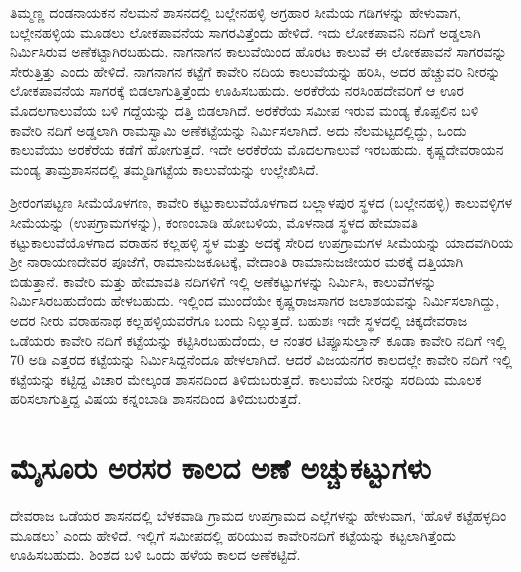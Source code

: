 ತಿಮ್ಮಣ್ಣ ದಂಡನಾಯಕನ ನೆಲಮನೆ ಶಾಸನದಲ್ಲಿ ಬಲ್ಲೇನಹಳ್ಳಿ ಅಗ್ರಹಾರ ಸೀಮೆಯ ಗಡಿಗಳನ್ನು ಹೇಳುವಾಗ, ಬಲ್ಲೇನಹಳ್ಳಿಯ ಮೂಡಲು ಲೋಕಪಾವನೆಯ ಸಾಗರವಿತ್ತೆಂದು ಹೇಳಿದೆ. ಇದು ಲೋಕಪಾವನಿ ನದಿಗೆ ಅಡ್ಡಲಾಗಿ ನಿರ್ಮಿಸಿರುವ ಅಣೆಕಟ್ಟಾಗಿರಬಹುದು. ನಾಗನಾಗನ ಕಾಲುವೆಯಿಂದ ಹೊರಟ ಕಾಲುವೆ ಈ ಲೋಕಪಾವನೆ ಸಾಗರವನ್ನು ಸೇರುತ್ತಿತ್ತು ಎಂದು ಹೇಳಿದೆ. ನಾಗನಾಗನ ಕಟ್ಟೆಗೆ ಕಾವೇರಿ ನದಿಯ ಕಾಲುವೆಯನ್ನು ಹರಿಸಿ, ಅದರ ಹೆಚ್ಚುವರಿ ನೀರನ್ನು ಲೋಕಪಾವನೆಯ ಸಾಗರಕ್ಕೆ ಬಿಡಲಾಗುತ್ತಿತ್ತೆಂದು ಊಹಿಸಬಹುದು. ಅರಕೆರೆಯ ನರಸಿಂಹದೇವರಿಗೆ ಆ ಊರ ಮೊದಲಗಾಲುವೆಯ ಬಳಿ ಗದ್ದೆಯನ್ನು ದತ್ತಿ ಬಿಡಲಾಗಿದೆ.  ಅರಕೆರೆಯ ಸಮೀಪ ಇರುವ ಮಂಡ್ಯ ಕೊಪ್ಪಲಿನ ಬಳಿ ಕಾವೇರಿ ನದಿಗೆ ಅಡ್ಡಲಾಗಿ ರಾಮಸ್ವಾಮಿ ಅಣೆಕಟ್ಟೆಯನ್ನು ನಿರ್ಮಿಸಲಾಗಿದೆ. ಅದು ನೆಲಮಟ್ಟದಲ್ಲಿದ್ದು, ಒಂದು ಕಾಲುವೆಯು ಅರಕೆರೆಯ ಕಡೆಗೆ ಹೋಗುತ್ತದೆ. ಇದೇ ಅರಕೆರೆಯ ಮೊದಲಗಾಲುವೆ ಇರಬಹುದು. ಕೃಷ್ಣದೇವರಾಯನ ಮಂಡ್ಯ ತಾಮ್ರಶಾಸನದಲ್ಲಿ ತಮ್ಮಡಿಗಟ್ಟೆಯ ಕಾಲುವೆಯನ್ನು ಉಲ್ಲೇಖಿಸಿದೆ.

ಶ‍್ರೀರಂಗಪಟ್ಟಣ ಸೀಮೆಯೊಳಗಣ, ಕಾವೇರಿ ಕಟ್ಟುಕಾಲುವೆಯೊಳಗಾದ ಬಲ್ಲಾಳಪುರ ಸ್ಥಳದ (ಬಲ್ಲೇನಹಳ್ಳಿ) ಕಾಲುವಳ್ಳಿಗಳ ಸೀಮೆಯನ್ನು (ಉಪಗ್ರಾಮಗಳನ್ನು), ಕಂಣಂಬಾಡಿ ಹೋಬಳಿಯ, ಮೊಳನಾಡ ಸ್ಥಳದ ಹೇಮಾವತಿ ಕಟ್ಟುಕಾಲುವೆ\-ಯೊಳಗಾದ ವರಾಹನ ಕಲ್ಲಹಳ್ಳಿ ಸ್ಥಳ ಮತ್ತು ಅದಕ್ಕೆ ಸೇರಿದ ಉಪಗ್ರಾಮಗಳ ಸೀಮೆಯನ್ನು ಯಾದವಗಿರಿಯ ಶ‍್ರೀ ನಾರಾಯಣದೇವರ ಪೂಜೆಗೆ, ರಾಮಾನುಜಕೂಟಕ್ಕೆ, ವೇದಾಂತಿ ರಾಮಾನುಜಜೀಯರ ಮಠಕ್ಕೆ ದತ್ತಿಯಾಗಿ ಬಿಡುತ್ತಾನೆ. ಕಾವೇರಿ ಮತ್ತು ಹೇಮಾವತಿ ನದಿಗಳಿಗೆ ಇಲ್ಲಿ ಅಣೆಕಟ್ಟುಗಳನ್ನು ನಿರ್ಮಿಸಿ, ಕಾಲುವೆಗಳನ್ನು ನಿರ್ಮಿಸಿರಬಹುದೆಂದು ಹೇಳಬಹುದು. ಇಲ್ಲಿಂದ ಮುಂದೆಯೇ ಕೃಷ್ಣರಾಜಸಾಗರ ಜಲಾಶಯವನ್ನು ನಿರ್ಮಿಸಲಾಗಿದ್ದು, ಅದರ ನೀರು ವರಾಹನಾಥ ಕಲ್ಲಹಳ್ಳಿಯವರೆಗೂ ಬಂದು ನಿಲ್ಲುತ್ತದೆ. ಬಹುಶಃ ಇದೇ ಸ್ಥಳದಲ್ಲಿ ಚಿಕ್ಕದೇವರಾಜ ಒಡೆಯರು ಕಾವೇರಿ ನದಿಗೆ ಕಟ್ಟೆಯನ್ನು ಕಟ್ಟಿಸಿರಬಹುದೆಂದು, ಆ ನಂತರ ಟಿಪ್ಪೂಸುಲ್ತಾನ್​ ಕೂಡಾ ಕಾವೇರಿ ನದಿಗೆ ಇಲ್ಲಿ 70 ಅಡಿ ಎತ್ತರದ ಕಟ್ಟೆಯನ್ನು ನಿರ್ಮಿಸಿದ್ದನೆಂದೂ ಹೇಳಲಾಗಿದೆ. ಆದರೆ ವಿಜಯನಗರ ಕಾಲದಲ್ಲೇ ಕಾವೇರಿ ನದಿಗೆ ಇಲ್ಲಿ ಕಟ್ಟೆಯನ್ನು ಕಟ್ಟಿದ್ದ ವಿಚಾರ ಮೇಲ್ಕಂಡ ಶಾಸನದಿಂದ ತಿಳಿದುಬರುತ್ತದೆ. ಕಾಲುವೆಯ ನೀರನ್ನು ಸರದಿಯ ಮೂಲಕ ಹರಿಸಲಾಗುತ್ತಿದ್ದ ವಿಷಯ ಕನ್ನಂಬಾಡಿ ಶಾಸನದಿಂದ ತಿಳಿದುಬರುತ್ತದೆ.

\section*{ಮೈಸೂರು ಅರಸರ ಕಾಲದ ಅಣೆ ಅಚ್ಚುಕಟ್ಟುಗಳು}

ದೇವರಾಜ ಒಡೆಯರ ಶಾಸನದಲ್ಲಿ ಬೆಳಕವಾಡಿ ಗ್ರಾಮದ ಉಪಗ್ರಾಮದ ಎಲ್ಲೆಗಳನ್ನು ಹೇಳುವಾಗ, ‘ಹೊಳೆ ಕಟ್ಟೆಹಳ್ಳದಿಂ ಮೂಡಲು’ ಎಂದು ಹೇಳಿದೆ. ಇಲ್ಲಿಗೆ ಸಮೀಪದಲ್ಲಿ ಹರಿಯುವ ಕಾವೇರಿನದಿಗೆ ಕಟ್ಟೆಯನ್ನು ಕಟ್ಟಲಾಗಿತ್ತೆಂದು ಊಹಿಸ\-ಬಹುದು. ಶಿಂಶದ ಬಳಿ ಒಂದು ಹಳೆಯ ಕಾಲದ ಅಣೆಕಟ್ಟಿದೆ.

